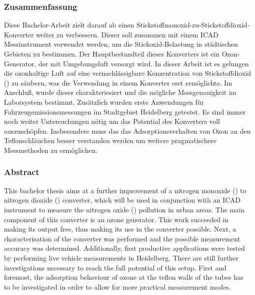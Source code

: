 
\subsubsection*{Zusammenfassung}
\label{sec:Zusammenfassung}

Diese Bachelor-Arbeit zielt darauf ab einen
Stickstoffmonoxid-zu-Stickstoffdioxid-Konverter weiter zu
verbessern. Dieser soll zusammen mit einem  ICAD
Messinstrument verwendet werden, um die Stickoxid-Belastung in
städtischen Gebieten zu bestimmen. Der Hauptbestandteil dieses
Konverters ist ein Ozon-Generator, der mit Umgebungsluft versorgt
wird. In dieser Arbeit ist es gelungen die ozonhaltige Luft auf eine
vernachlässigbare Konzentration von Stickstoffdioxid () zu
säubern, was die Verwendung in einem Konverter erst ermöglichte. Im
Anschluß, wurde dieser charakteriesiert und die mögliche 
Messgenauigkeit im Laborsystem bestimmt. Zusätzlich wurden erste
Anwendungen für Fahrzeugemissionsmessungen im Stadtgebiet Heidelberg
getestet. Es sind immer noch weiter Untersuchungen nötig um das
Potential des Konverters voll auszuschöpfen. Insbesondere muss das das
Adsorptionsverhalten von Ozon an den Teflonschläuchen besser
verstanden werden um weitere pragmatischere Messmethoden zu
ermöglichen.


\subsubsection*{Abstract}
\label{sec:abstract}

This bachelor thesis aims at a further improvement of a nitrogen
monoxide () to nitrogen dioxide () converter, which
will be used in conjunction with an  ICAD instrument to
measure the nitrogen oxide () pollution in urban areas. The
main component of this converter is an ozone generator. This work
succeeded in making its output  free, thus making its use in
the converter possible. Next, a characterisation of the converter was
performed and the possible  measurement accuracy was
determined. Additionally, first productive applications were tested by
performing live vehicle measurements in Heidelberg. There are still
further investigations necessary to reach the full potential of this
setup. First and foremost, the adsorption behaviour of ozone at the
teflon walls of the tubes has to be investigated in order to allow for
more practical measurement modes.

